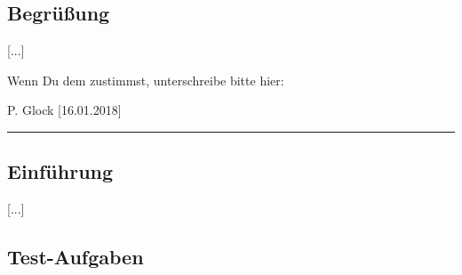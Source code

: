 \subsection*{Begrüßung}
[...]

Wenn Du dem zustimmst, unterschreibe bitte hier:

\vspace*{1em}
P. Glock [16.01.2018]\vspace*{-.9em}\\
\noindent\rule{8cm}{0.4pt}

\subsection*{Einführung}
[...]
\subsection*{Test-Aufgaben}
